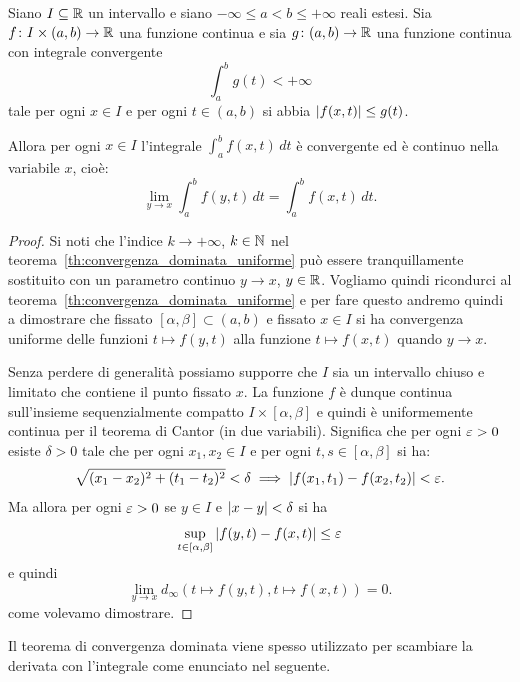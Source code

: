 \begin{theorem}
%
  \label{th:convergenza_dominata}%
  \mymark{**}%
Siano $I\subseteq {\mathbb R}$ un intervallo e siano $-\infty \le a < b \le +\infty$ reali estesi.
Sia $f\colon I \times(a,b)\to {\mathbb R}$ una funzione continua 
e sia $g\colon(a,b)\to {\mathbb R}$ una funzione continua con integrale convergente
\[
 \int_a^b g(t) < +\infty
\]
tale per ogni $x\in I$ e per ogni $t\in(a,b)$ si abbia ${\left|f(x,t)\right|} \le g(t)$.

Allora per ogni $x\in I$ l'integrale $\int_a^b f(x,t)\, dt$ è convergente ed è continuo 
nella variabile $x$, cioè:
\[
  \lim_{y\to x} \int_a^b f(y,t)  \, dt = \int_a^b f(x,t)\, dt.
\]
\end{theorem}
%
\begin{proof}
Si noti che l'indice $k\to +\infty$, $k\in {\mathbb N}$ nel teorema~\ref{th:convergenza_dominata_uniforme} 
può essere tranquillamente sostituito con un parametro continuo $y\to x$, $y\in {\mathbb R}$.
Vogliamo quindi ricondurci al teorema~\ref{th:convergenza_dominata_uniforme} 
e per fare questo andremo quindi a dimostrare che fissato $[\alpha,\beta]\subset (a,b)$ 
e fissato $x\in I$ si ha convergenza uniforme delle funzioni $t\mapsto f(y,t)$ alla funzione $t\mapsto f(x,t)$
quando $y\to x$. 

Senza perdere di generalità possiamo supporre che $I$ sia un intervallo chiuso e limitato 
che contiene il punto fissato $x$. 
La funzione $f$ è dunque continua sull'insieme sequenzialmente compatto $I\times [\alpha,\beta]$ 
e quindi è uniformemente continua
per il teorema di Cantor (in due variabili).
Significa che per ogni $\varepsilon>0$ esiste $\delta>0$ tale che per ogni $x_1,x_2\in I$ 
e per ogni $t,s\in[\alpha,\beta]$ si ha:
\[
\sqrt{(x_1-x_2)^2+(t_1-t_2)^2} < \delta \implies {\left|f(x_1,t_1)-f(x_2,t_2)\right|} < \varepsilon.  
\]
Ma allora per ogni $\varepsilon>0$ se $y\in I$ e ${\left|x-y\right|} < \delta$ si ha 
\[
  \sup_{t\in\left[\alpha,\beta\right]} {\left|f(y,t)-f(x,t)\right|} \le \varepsilon
\]
e quindi
\[
  \lim_{y\to x}  d_\infty(t\mapsto f(y,t), t\mapsto f(x,t)) = 0.
\]
come volevamo dimostrare.
\end{proof}
%
Il teorema di convergenza dominata viene spesso utilizzato 
per scambiare la derivata con l'integrale come enunciato nel seguente.
%
